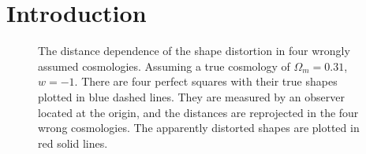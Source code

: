 \documentclass[iop]{emulateapj}
\providecommand{\DIFadd}[1]{{\protect\color{blue}\uwave{#1}}} %
\providecommand{\DIFdel}[1]{{\protect\color{red}\sout{#1}}}                      %
\providecommand{\DIFaddFL}[1]{\DIFadd{#1}} %
\providecommand{\DIFdelFL}[1]{\DIFdel{#1}} %
\providecommand{\DIFaddbeginFL}{} %
\providecommand{\DIFaddendFL}{} %
\providecommand{\DIFdelbeginFL}{} %
\providecommand{\DIFdelendFL}{} %
\begin{document}




\section{Introduction}

\begin{figure}
   \caption{\label{fig_xy}
   The distance dependence of the shape distortion in four wrongly assumed cosmologies.
   Assuming a true cosmology of \DIFdelbeginFL \DIFdelFL{$\Omega_m=0.31$}\DIFdelendFL \DIFaddbeginFL \DIFaddFL{$\Omega_m=0.26$}\DIFaddendFL , $w=-1$.
   There are four perfect squares with their true shapes plotted in blue dashed lines.
   They are measured by an observer located at the origin, and the distances are reprojected in the four wrong cosmologies.
   The apparently distorted shapes are plotted in red solid lines.
   }
\end{figure}
\end{document}
